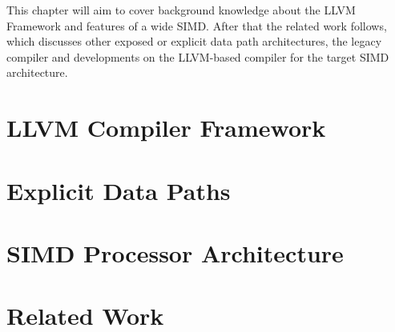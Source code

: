 This chapter will aim to cover background knowledge about the LLVM Framework and features of a wide SIMD. After that the related work follows, which discusses other exposed or explicit data path architectures, the legacy compiler and developments on the LLVM-based compiler for the target SIMD architecture.

\section{LLVM Compiler Framework}\label{sec:llvm}


\newpage
\section{Explicit Data Paths}\label{sec:datapaths}


\newpage
\section{SIMD Processor Architecture}\label{sec:simd}


\section{Related Work}\label{sec:related_work}
